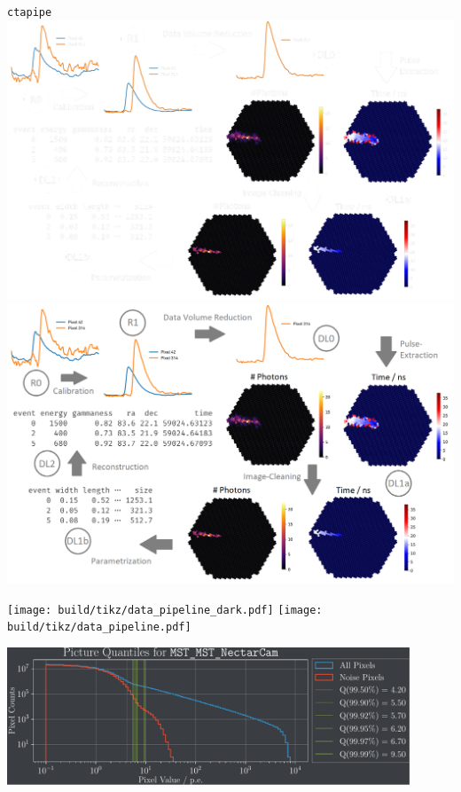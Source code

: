 \begin{frame}{\texttt{ctapipe}}
    {%
    \centering
    \includegraphics[height=0.95\textheight]{graphics/ctapipe_light.pdf}
    }
    {%
    \centering
    \includegraphics[height=0.95\textheight]{graphics/ctapipe.png}
    }
\end{frame}

\begin{frame}
    {%
    \centering
    \texttt{[image: build/tikz/data\_pipeline\_dark.pdf]}
    }
    {%
    \centering
    \texttt{[image: build/tikz/data\_pipeline.pdf]}
    }

\end{frame}

\begin{frame}
    \centering
    \includegraphics[width=0.9\textwidth]{build/quantiles_plot.pdf}
\end{frame}
